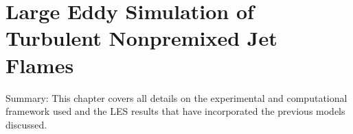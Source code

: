 \chapter{Large Eddy Simulation of Turbulent Nonpremixed Jet Flames\label{ch:lesresults}}

Summary: This chapter covers all details on the experimental and computational framework used and the LES results that have incorporated the previous models discussed.







